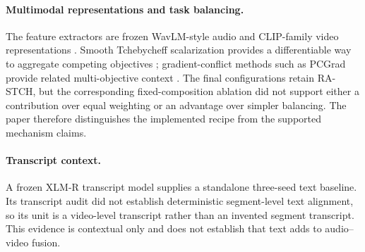 \paragraph{Multimodal representations and task balancing.}
The feature extractors are frozen WavLM-style audio and CLIP-family video representations \citep{chen2022wavlm,radford2021clip}. Smooth Tchebycheff scalarization provides a differentiable way to aggregate competing objectives \citep{lin2024stch}; gradient-conflict methods such as PCGrad provide related multi-objective context \citep{yu2020pcgrad}. The final configurations retain RA-STCH, but the corresponding fixed-composition ablation did not support either a contribution over equal weighting or an advantage over simpler balancing. The paper therefore distinguishes the implemented recipe from the supported mechanism claims.

\paragraph{Transcript context.}
A frozen XLM-R transcript model \citep{conneau2020xlmr} supplies a standalone three-seed text baseline. Its transcript audit did not establish deterministic segment-level text alignment, so its unit is a video-level transcript rather than an invented segment transcript. This evidence is contextual only and does not establish that text adds to audio--video fusion.
